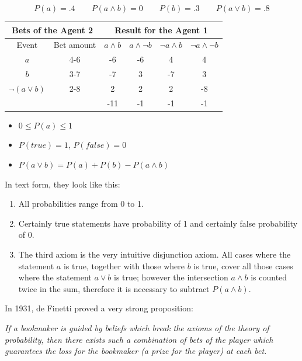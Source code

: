 \documentclass{article}
\begin{document}
$$P(a) = .4  \qquad  P(a\wedge b) = 0 \qquad P(b) = .3 \qquad P(a\vee b) = .8$$
	
\begin{tabular}{cccccc}
	\multicolumn{2}{c}{Bets of the Agent 2}  &  \multicolumn{4}{c}{Result for the Agent 1} \\
	\hline
	{\tiny Event} & {\tiny Bet amount} & {\tiny $a\wedge b$} & {\tiny $a\wedge \neg b$} &  {\tiny $\neg a\wedge b$} &  {\tiny $\neg a\wedge\neg b$} \\
	\hline
	$a$             & 4-6 & -6 & -6 &  4 &  4 \\
	$b$             & 3-7 & -7 &  3 & -7 &  3 \\
	$\neg(a\vee b)$ & 2-8 &  2 &  2 &  2 & -8 \\
	\hline
	&     &-11 & -1 & -1 & -1
\end{tabular}
	
\begin{itemize}
	\item $0\leq P(a)\leq 1$
	\item $P(true)=1$, $P(false) = 0$
	\item $P(a\vee b) = P(a) + P(b) - P(a\wedge b)$
\end{itemize}

In text form, they look like this:
\begin{enumerate}
\item All probabilities range from 0 to 1.
\item Certainly true statements have probability of 1 and certainly false probability of 0.
\item The third axiom is the very intuitive disjunction axiom.
All cases where the statement $a$ is true, together with those where $b$ is true,
cover all those cases where the statement $a\vee b$ is true; however the intersection $a\wedge b$ is counted twice in the sum, therefore it is necessary to subtract $P(a\wedge b)$.
\end{enumerate}

In 1931, de Finetti proved a very strong proposition:

\vspace{4mm}

\textit{If a bookmaker is guided by beliefs which break the axioms of the theory of probability,
then there exists such a combination of bets of the player which guarantees the loss for the bookmaker (a prize for the player) at each bet.
}

\vspace{4mm}
\end{document}
